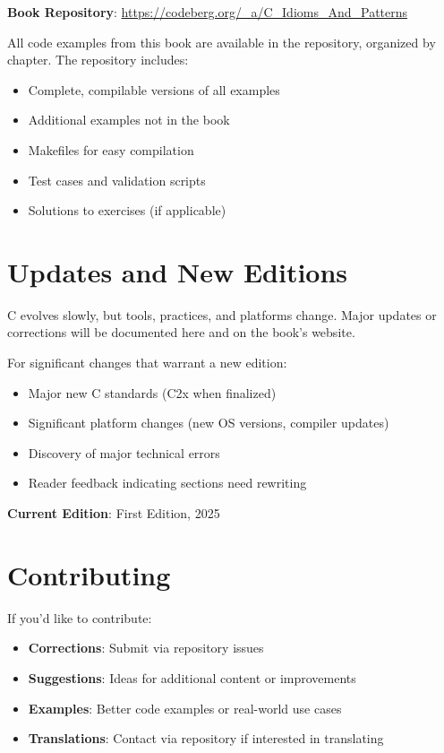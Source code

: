 \documentclass[11pt,openany]{book}
\begin{document}
\textbf{Book Repository}: \url{https://codeberg.org/_a/C_Idioms_And_Patterns}

All code examples from this book are available in the repository, organized by chapter. The repository includes:
\begin{itemize}
    \item Complete, compilable versions of all examples
    \item Additional examples not in the book
    \item Makefiles for easy compilation
    \item Test cases and validation scripts
    \item Solutions to exercises (if applicable)
\end{itemize}

\section*{Updates and New Editions}

C evolves slowly, but tools, practices, and platforms change. Major updates or corrections will be documented here and on the book's website.

For significant changes that warrant a new edition:
\begin{itemize}
    \item Major new C standards (C2x when finalized)
    \item Significant platform changes (new OS versions, compiler updates)
    \item Discovery of major technical errors
    \item Reader feedback indicating sections need rewriting
\end{itemize}

\textbf{Current Edition}: First Edition, 2025

\section*{Contributing}

If you'd like to contribute:
\begin{itemize}
    \item \textbf{Corrections}: Submit via repository issues
    \item \textbf{Suggestions}: Ideas for additional content or improvements
    \item \textbf{Examples}: Better code examples or real-world use cases
    \item \textbf{Translations}: Contact via repository if interested in translating
\end{itemize}
\end{document}

